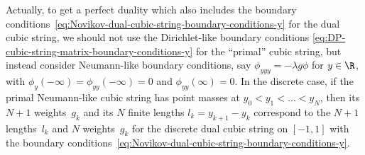 \documentclass[10pt,a4paper]{article} \pdfoutput=1 
\begin{document}
Actually, to get a perfect duality
which also includes
the boundary conditions~\eqref{eq:Novikov-dual-cubic-string-boundary-conditions-y}
for the dual cubic string,
we should not use the Dirichlet-like boundary conditions
\eqref{eq:DP-cubic-string-matrix-boundary-conditions-y}
for the ``primal'' cubic string,
but instead consider Neumann-like boundary conditions,
say $\phi_{yyy} = -\lambda g \phi$ for $y\in\R$,
with $\phi_y(-\infty) = \phi_{yy}(-\infty) = 0$ and
$\phi_{yy}(\infty) = 0$.
In the discrete case,
if  the primal Neumann-like cubic string has
point masses at $y_0 < y_1 < \dots < y_N$,
then its $N+1$ weights~$g_k$ and its $N$ finite lengths $l_k = y_{k+1}-y_k$
correspond to the $N+1$ lengths~$l_k$ and $N$ weights~$g_k$ for the discrete dual cubic string
on $[-1,1]$ with the boundary
conditions~\eqref{eq:Novikov-dual-cubic-string-boundary-conditions-y}.
\end{document}
